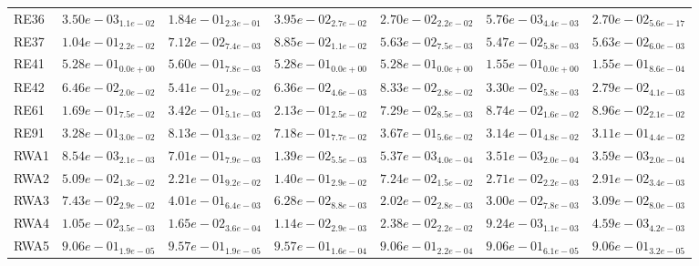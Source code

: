 \documentclass{article}
\begin{document}
\begin{table}
\begin{scriptsize}
\begin{tabular}{lllllll}
RE36 & \cellcolor{gray95}$  3.50e-03_{ 1.1e-02}$ & $  1.84e-01_{ 2.3e-01}$ & $  3.95e-02_{ 2.7e-02}$ & $  2.70e-02_{ 2.2e-02}$ & \cellcolor{gray25}$  5.76e-03_{ 4.4e-03}$ & $  2.70e-02_{ 5.6e-17}$ \\
RE37 & $  1.04e-01_{ 2.2e-02}$ & $  7.12e-02_{ 7.4e-03}$ & $  8.85e-02_{ 1.1e-02}$ & \cellcolor{gray25}$  5.63e-02_{ 7.5e-03}$ & \cellcolor{gray95}$  5.47e-02_{ 5.8e-03}$ & $  5.63e-02_{ 6.0e-03}$ \\
RE41 & $  5.28e-01_{ 0.0e+00}$ & $  5.60e-01_{ 7.8e-03}$ & $  5.28e-01_{ 0.0e+00}$ & $  5.28e-01_{ 0.0e+00}$ & \cellcolor{gray95}$  1.55e-01_{ 0.0e+00}$ & \cellcolor{gray25}$  1.55e-01_{ 8.6e-04}$ \\
RE42 & $  6.46e-02_{ 2.0e-02}$ & $  5.41e-01_{ 2.9e-02}$ & $  6.36e-02_{ 4.6e-03}$ & $  8.33e-02_{ 2.8e-02}$ & \cellcolor{gray25}$  3.30e-02_{ 5.8e-03}$ & \cellcolor{gray95}$  2.79e-02_{ 4.1e-03}$ \\
RE61 & $  1.69e-01_{ 7.5e-02}$ & $  3.42e-01_{ 5.1e-03}$ & $  2.13e-01_{ 2.5e-02}$ & \cellcolor{gray95}$  7.29e-02_{ 8.5e-03}$ & \cellcolor{gray25}$  8.74e-02_{ 1.6e-02}$ & $  8.96e-02_{ 2.1e-02}$ \\
RE91 & $  3.28e-01_{ 3.0e-02}$ & $  8.13e-01_{ 3.3e-02}$ & $  7.18e-01_{ 7.7e-02}$ & $  3.67e-01_{ 5.6e-02}$ & \cellcolor{gray25}$  3.14e-01_{ 4.8e-02}$ & \cellcolor{gray95}$  3.11e-01_{ 4.4e-02}$ \\
RWA1 & $  8.54e-03_{ 2.1e-03}$ & $  7.01e-01_{ 7.9e-03}$ & $  1.39e-02_{ 5.5e-03}$ & $  5.37e-03_{ 4.0e-04}$ & \cellcolor{gray95}$  3.51e-03_{ 2.0e-04}$ & \cellcolor{gray25}$  3.59e-03_{ 2.0e-04}$ \\
RWA2 & $  5.09e-02_{ 1.3e-02}$ & $  2.21e-01_{ 9.2e-02}$ & $  1.40e-01_{ 2.9e-02}$ & $  7.24e-02_{ 1.5e-02}$ & \cellcolor{gray95}$  2.71e-02_{ 2.2e-03}$ & \cellcolor{gray25}$  2.91e-02_{ 3.4e-03}$ \\
RWA3 & $  7.43e-02_{ 2.9e-02}$ & $  4.01e-01_{ 6.4e-03}$ & $  6.28e-02_{ 8.8e-03}$ & \cellcolor{gray95}$  2.02e-02_{ 2.8e-03}$ & \cellcolor{gray25}$  3.00e-02_{ 7.8e-03}$ & $  3.09e-02_{ 8.0e-03}$ \\
RWA4 & $  1.05e-02_{ 3.5e-03}$ & $  1.65e-02_{ 3.6e-04}$ & $  1.14e-02_{ 2.9e-03}$ & $  2.38e-02_{ 2.2e-02}$ & \cellcolor{gray25}$  9.24e-03_{ 1.1e-03}$ & \cellcolor{gray95}$  4.59e-03_{ 4.2e-03}$ \\
RWA5 & $  9.06e-01_{ 1.9e-05}$ & $  9.57e-01_{ 1.9e-05}$ & $  9.57e-01_{ 1.6e-04}$ & $  9.06e-01_{ 2.2e-04}$ & \cellcolor{gray25}$  9.06e-01_{ 6.1e-05}$ & \cellcolor{gray95}$  9.06e-01_{ 3.2e-05}$ \\

\end{tabular}
\end{scriptsize}
\end{table}
\end{document}
